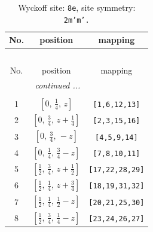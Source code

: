 \documentclass[fleqn,8pt]{jsarticle}
\begin{document}
\begin{longtable}{ccc}
\caption{Wyckoff site: {\tt 8e}, site symmetry: {\tt 2m'm'.}}
 \\
 \hline \hline
No. & position & mapping \\ \hline \endfirsthead

\multicolumn{2}{l}{\tablename\ \thetable{}} \\
 \hline \hline
No. & position & mapping \\ \hline \endhead

 \hline \hline
\multicolumn{2}{r}{\footnotesize\it continued ...} \\ \endfoot

 \hline \hline
\multicolumn{2}{r}{} \\ \endlastfoot

1 & $\left[ 0,\, \frac{1}{4},\, z \right]$ & {\tt [1,6,12,13]} \\ \hline
2 & $\left[ 0,\, \frac{3}{4},\, z + \frac{1}{4} \right]$ & {\tt [2,3,15,16]} \\ \hline
3 & $\left[ 0,\, \frac{3}{4},\, - z \right]$ & {\tt [4,5,9,14]} \\ \hline
4 & $\left[ 0,\, \frac{1}{4},\, \frac{3}{4} - z \right]$ & {\tt [7,8,10,11]} \\ \hline
5 & $\left[ \frac{1}{2},\, \frac{3}{4},\, z + \frac{1}{2} \right]$ & {\tt [17,22,28,29]} \\ \hline
6 & $\left[ \frac{1}{2},\, \frac{1}{4},\, z + \frac{3}{4} \right]$ & {\tt [18,19,31,32]} \\ \hline
7 & $\left[ \frac{1}{2},\, \frac{1}{4},\, \frac{1}{2} - z \right]$ & {\tt [20,21,25,30]} \\ \hline
8 & $\left[ \frac{1}{2},\, \frac{3}{4},\, \frac{1}{4} - z \right]$ & {\tt [23,24,26,27]} \\
\end{longtable}
\renewcommand{\arraystretch}{1.2}
\end{document}
